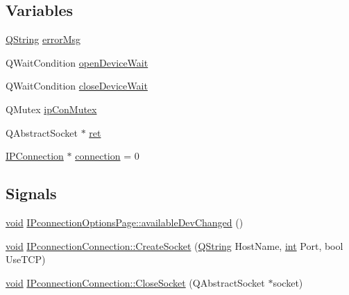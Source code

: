 \subsection*{Variables}
\begin{DoxyCompactItemize}
\item 
\hyperlink{group___u_a_v_objects_plugin_gab9d252f49c333c94a72f97ce3105a32d}{Q\-String} \hyperlink{group___i_p_conn_plugin_ga2146099b9930944186a7ecc208950d22}{error\-Msg}
\item 
Q\-Wait\-Condition \hyperlink{group___i_p_conn_plugin_ga1724de889bbf979017a390aae2554bbd}{open\-Device\-Wait}
\item 
Q\-Wait\-Condition \hyperlink{group___i_p_conn_plugin_gaaa3820e584b5def7970dfed0b248a6f1}{close\-Device\-Wait}
\item 
Q\-Mutex \hyperlink{group___i_p_conn_plugin_gae78cf6a3d1073c22be5cc8054ae1e8d6}{ip\-Con\-Mutex}
\item 
Q\-Abstract\-Socket $\ast$ \hyperlink{group___i_p_conn_plugin_gabc99fe6afec1a75ccff1092e47375a40}{ret}
\item 
\hyperlink{class_i_p_connection}{I\-P\-Connection} $\ast$ \hyperlink{group___i_p_conn_plugin_ga75cb9b33b52928c030806876f2c2f439}{connection} = 0
\end{DoxyCompactItemize}
\subsection*{Signals}
\begin{DoxyCompactItemize}
\item 
\hyperlink{group___u_a_v_objects_plugin_ga444cf2ff3f0ecbe028adce838d373f5c}{void} \hyperlink{group___i_p_conn_plugin_ga1fa25251ff83374c3d8c41d161406b3a}{I\-Pconnection\-Options\-Page\-::available\-Dev\-Changed} ()
\item 
\hyperlink{group___u_a_v_objects_plugin_ga444cf2ff3f0ecbe028adce838d373f5c}{void} \hyperlink{group___i_p_conn_plugin_gae512a545bf7714b3a085d0a9ffec49e5}{I\-Pconnection\-Connection\-::\-Create\-Socket} (\hyperlink{group___u_a_v_objects_plugin_gab9d252f49c333c94a72f97ce3105a32d}{Q\-String} Host\-Name, \hyperlink{ioapi_8h_a787fa3cf048117ba7123753c1e74fcd6}{int} Port, bool Use\-T\-C\-P)
\item 
\hyperlink{group___u_a_v_objects_plugin_ga444cf2ff3f0ecbe028adce838d373f5c}{void} \hyperlink{group___i_p_conn_plugin_ga382e928a679913b5d226abbd10a08167}{I\-Pconnection\-Connection\-::\-Close\-Socket} (Q\-Abstract\-Socket $\ast$socket)
\end{DoxyCompactItemize}
